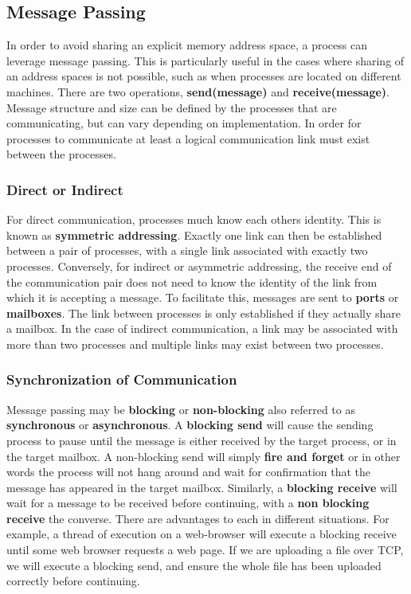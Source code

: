 \documentclass[10pt,a4paper]{article}
\begin{document}
\subsection{Message Passing}
In order to avoid sharing an explicit memory address space, a process can leverage message passing. This is particularly useful in the cases where sharing of an address spaces is not possible, such as when processes are located on different machines. There are two operations, {\bf send(message)} and {\bf receive(message)}. Message structure and size can be defined by the processes that are communicating, but can vary depending on implementation. In order for processes to communicate at least a logical communication link must exist between the processes. 
\subsubsection{Direct or Indirect}
For direct communication, processes much know each others identity. This is known as {\bf symmetric addressing}.  Exactly one link can then be established between a pair of processes, with a single link associated with exactly two processes. Conversely, for indirect or asymmetric addressing, the receive end of the communication pair does not need to know the identity of the link from which it is accepting a message. To facilitate this, messages are sent to {\bf ports} or {\bf mailboxes}. The link between processes is only established if they actually share a mailbox. In the case of indirect communication, a link may be associated with more than two processes and multiple links may exist between two processes.
\subsubsection{Synchronization of Communication} 
Message passing may be {\bf blocking} or {\bf non-blocking} also referred to as {\bf synchronous} or {\bf asynchronous}. A {\bf blocking send} will cause the sending process to pause until the message is either received by the target process, or in the target mailbox. A non-blocking send will simply {\bf fire and forget} or in other words the process will not hang around and wait for confirmation that the message has appeared in the target mailbox. Similarly, a {\bf blocking receive} will wait for a message to be received  before continuing, with a {\bf non blocking receive} the converse. There are advantages to each in different situations. For example, a thread of execution on a web-browser will execute a blocking receive until some web browser requests a web page. If we are uploading a file over TCP, we will execute a blocking send, and ensure the whole file has been uploaded correctly before continuing. 
\end{document}
